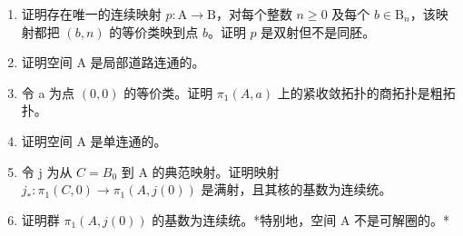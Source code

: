 \begin{enumerate}
\def\labelenumi{\alph{enumi})}
\item
  证明存在唯一的连续映射 \(p \colon \mathrm{A} \to \mathrm{B}\)，对每个整数 \(n \geqslant 0\) 及每个 \(b \in \mathrm{B}_n\)，该映射都把 \((b, n)\) 的等价类映到点 \(b\)。证明 \(p\) 是双射但不是同胚。
\item
  证明空间 A 是局部道路连通的。
\item
  令 a 为点 \((0,0)\) 的等价类。证明 \(\pi_{1}(A,a)\) 上的紧收敛拓扑的商拓扑是粗拓扑。
\item
  证明空间 A 是单连通的。
\item
  令 j 为从 \(C = B_{0}\) 到 A 的典范映射。证明映射 \(j_{*} \colon \pi_{1}(C,0) \to \pi_{1}(A,j(0))\) 是满射，且其核的基数为连续统。
\item
  证明群 \(\pi_{1}(A,j(0))\) 的基数为连续统。*特别地，空间 A 不是可解圈的。*
\end{enumerate}


